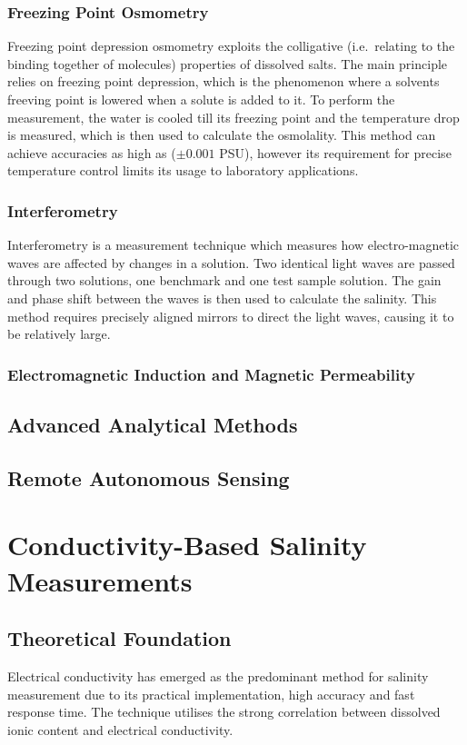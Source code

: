 \subsubsection{Freezing Point Osmometry}
Freezing point depression osmometry exploits the colligative (i.e.~relating to the binding together of molecules) properties of dissolved salts.
The main principle relies on freezing point depression, which is the phenomenon where a solvents freeving point is lowered when a solute is added to it.
To perform the measurement, the water is cooled till its freezing point and the temperature drop is measured, which is then used to calculate the osmolality.
This method can achieve accuracies as high as ($\pm0.001$ PSU), however its requirement for precise temperature control limits its usage to laboratory applications.

\subsubsection{Interferometry}
Interferometry is a measurement technique which measures how electro-magnetic waves are affected by changes in a solution.
Two identical light waves are passed through two solutions, one benchmark and one test sample solution.
The gain and phase shift between the waves is then used to calculate the salinity. 
This method requires precisely aligned mirrors to direct the light waves, causing it to be relatively large.

\subsubsection{Electromagnetic Induction and Magnetic Permeability}


\subsection{Advanced Analytical Methods}


\subsection{Remote Autonomous Sensing}


\section{Conductivity-Based Salinity Measurements}
\subsection{Theoretical Foundation}
Electrical conductivity has emerged as the predominant method for salinity measurement due to its practical implementation, high accuracy and fast response time.
The technique utilises the strong correlation between dissolved ionic content and electrical conductivity.

